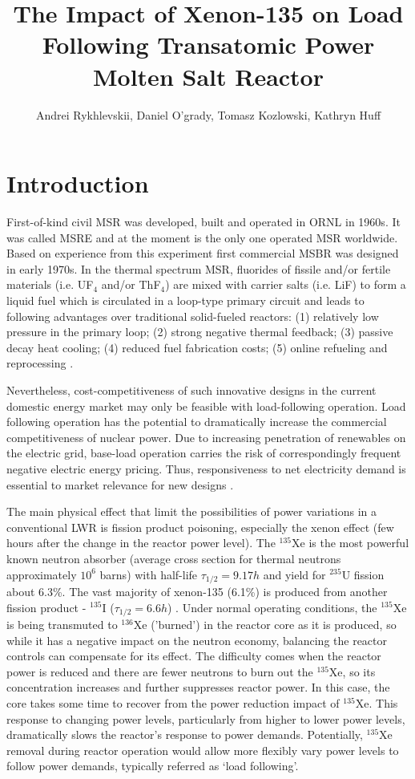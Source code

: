 \documentclass{anstrans}
\title{The Impact of Xenon-135 on Load Following Transatomic Power 
Molten Salt Reactor}
\author{Andrei Rykhlevskii, Daniel O'grady, Tomasz Kozlowski, Kathryn Huff}
\institute{
        Department of Nuclear, Plasma, and Radiological Engineering, University 
        of Illinois at Urbana-Champaign \break
        Urbana, IL
}
\begin{document}
\section{Introduction}
First-of-kind civil \gls{MSR} was developed, built and operated in \gls{ORNL}  
in 1960s. It was called \gls{MSRE} and at the moment is the
only one operated 
\gls{MSR} worldwide. Based on experience from this experiment first commercial
\gls{MSBR} was designed in early 1970s. In the thermal spectrum \gls{MSR}, 
fluorides of fissile and/or fertile materials (i.e.
UF$_4$ and/or 
ThF$_4$) are mixed with carrier salts (i.e. LiF) to form a liquid fuel
which 
is circulated in a loop-type primary circuit and leads to following 
advantages over traditional solid-fueled reactors: (1) relatively low pressure 
in the primary loop; (2) strong negative thermal feedback; (3) passive decay 
heat cooling; (4) reduced fuel fabrication costs; (5) online refueling and 
reprocessing \cite{haubenreich_experience_1970}.

Nevertheless, cost-competitiveness of such innovative designs in the current 
domestic energy market may only be feasible with load-following operation. 
Load following operation has the potential to dramatically increase the 
commercial competitiveness of nuclear power. Due to increasing penetration of 
renewables on the electric grid, base-load operation carries the risk of 
correspondingly frequent negative electric energy pricing. Thus, 
responsiveness to net electricity demand is essential to market relevance for
new designs \cite{energy_information_administration_u.s._2016}.

The main physical effect that limit the possibilities of power variations in a 
conventional \gls{LWR} is fission product poisoning, especially the xenon  
effect (few hours after the change in the reactor power level).  The 
$^{135}$Xe is the most powerful known neutron absorber (average cross section 
for thermal neutrons approximately $10^6$ barns) with half-life  
$\tau_{1/2}=9.17h$ and yield for $^{235}$U fission about 6.3\%. The vast 
majority of xenon-135 (6.1\%) is produced from another fission product - 
$^{135}$I ($\tau_{1/2}=6.6h$) \cite{lokhov_technical_2011}. Under normal 
operating conditions, the $^{135}$Xe is being transmuted to $^{136}$Xe 
('burned') in the reactor core as it is produced, so while it has a negative 
impact on the neutron economy, balancing the reactor controls can compensate 
for its effect. The difficulty comes when the reactor power is reduced and 
there are fewer neutrons to burn out the $^{135}$Xe, so its concentration 
increases and further suppresses reactor power. In this case, the core takes 
some time to recover from the power reduction impact of $^{135}$Xe. This 
response to changing power levels, particularly from higher to lower power 
levels, dramatically slows the reactor's response to power demands. 
Potentially, $^{135}$Xe removal during reactor operation would allow more 
flexibly vary power levels to follow power demands, typically referred as 
`load following'.
\end{document}
